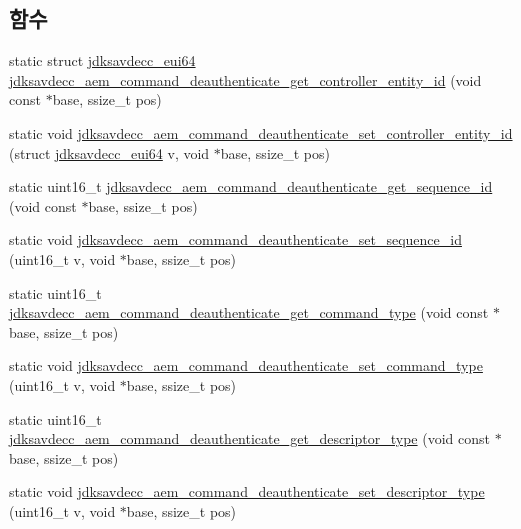 \subsection*{함수}
\begin{DoxyCompactItemize}
\item 
static struct \hyperlink{structjdksavdecc__eui64}{jdksavdecc\+\_\+eui64} \hyperlink{group__command__deauthenticate_ga42b199be8914bcf71025b626d0d66c6e}{jdksavdecc\+\_\+aem\+\_\+command\+\_\+deauthenticate\+\_\+get\+\_\+controller\+\_\+entity\+\_\+id} (void const $\ast$base, ssize\+\_\+t pos)
\item 
static void \hyperlink{group__command__deauthenticate_gaca7acc6925181399850f2d9ef5eb2de4}{jdksavdecc\+\_\+aem\+\_\+command\+\_\+deauthenticate\+\_\+set\+\_\+controller\+\_\+entity\+\_\+id} (struct \hyperlink{structjdksavdecc__eui64}{jdksavdecc\+\_\+eui64} v, void $\ast$base, ssize\+\_\+t pos)
\item 
static uint16\+\_\+t \hyperlink{group__command__deauthenticate_gafe4c1d22d610443fb97bb35351451268}{jdksavdecc\+\_\+aem\+\_\+command\+\_\+deauthenticate\+\_\+get\+\_\+sequence\+\_\+id} (void const $\ast$base, ssize\+\_\+t pos)
\item 
static void \hyperlink{group__command__deauthenticate_gae1b5cf355cd280f6d711672539f233cc}{jdksavdecc\+\_\+aem\+\_\+command\+\_\+deauthenticate\+\_\+set\+\_\+sequence\+\_\+id} (uint16\+\_\+t v, void $\ast$base, ssize\+\_\+t pos)
\item 
static uint16\+\_\+t \hyperlink{group__command__deauthenticate_ga7b0911d5bb841a6c8bf61ce54907e6ab}{jdksavdecc\+\_\+aem\+\_\+command\+\_\+deauthenticate\+\_\+get\+\_\+command\+\_\+type} (void const $\ast$base, ssize\+\_\+t pos)
\item 
static void \hyperlink{group__command__deauthenticate_gaa0897f169b34f65d05c57a26bd5c6d5d}{jdksavdecc\+\_\+aem\+\_\+command\+\_\+deauthenticate\+\_\+set\+\_\+command\+\_\+type} (uint16\+\_\+t v, void $\ast$base, ssize\+\_\+t pos)
\item 
static uint16\+\_\+t \hyperlink{group__command__deauthenticate_ga9f3254fac42d0f9b431b08ee9b3c4398}{jdksavdecc\+\_\+aem\+\_\+command\+\_\+deauthenticate\+\_\+get\+\_\+descriptor\+\_\+type} (void const $\ast$base, ssize\+\_\+t pos)
\item 
static void \hyperlink{group__command__deauthenticate_ga282ebdade6638f9e29f0eb037d7c9825}{jdksavdecc\+\_\+aem\+\_\+command\+\_\+deauthenticate\+\_\+set\+\_\+descriptor\+\_\+type} (uint16\+\_\+t v, void $\ast$base, ssize\+\_\+t pos)
\item 

\end{DoxyCompactItemize}
